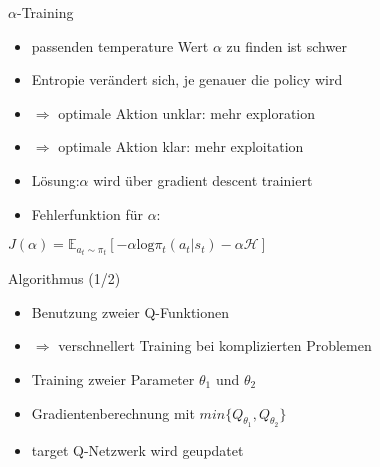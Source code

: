 \begin{frame}{$\alpha$-Training}
\begin{itemize}
\item passenden temperature Wert $\alpha$ zu finden ist schwer
\item Entropie verändert sich, je genauer die policy wird
\item[] $\Rightarrow$ optimale Aktion unklar: mehr exploration
\item[] $\Rightarrow$ optimale Aktion klar: mehr exploitation \\[12pt]

\item Lösung:$\alpha$ wird über gradient descent trainiert
\item Fehlerfunktion für $\alpha$:
\end{itemize}
\center$J(\alpha)=\mathbb{E}_{a_{t}\sim\pi_{t}}\left[-\alpha \mathrm{log}\pi_{t}(a_{t}|s_{t})-\alpha \mathcal{H}\right]$
\end{frame}

\begin{frame}{Algorithmus (1/2)}
\begin{itemize}
\item Benutzung zweier Q-Funktionen
\item[] $\Rightarrow$ verschnellert Training bei komplizierten Problemen \\[12pt]
\item Training zweier Parameter $\theta_{1}$ und $\theta_{2}$
\item Gradientenberechnung mit $min\{Q_{\theta_{1}},Q_{\theta_{2}}\}$
\item target Q-Netzwerk wird geupdatet
\end{itemize}
\end{frame}

